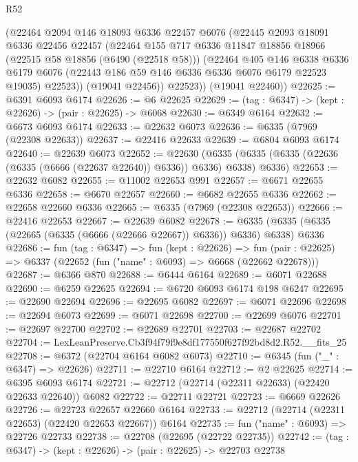 \begin{lexlean}{R52}
\begin{coremodule}
        (@22464
          @2094
          @146
          @18093
          @6336
          @22457
          @6076
          (@22445
            @2093
            @18091
            @6336
            @22456
            @22457
            (@22464
              @155
              @717
              @6336
              @11847
              @18856
              @18966
              (@22515 @58 @18856 (@6490 (@22518 @58)))
              (@22464
                @405
                @146
                @6338
                @6336
                @6179
                @6076
                (@22443 @186 @59 @146 @6336 @6336 @6076 @6179 @22523 @19035)
                @22523))
            (@19041 @22456))
          @22523))
      (@19041 @22460))
@22625 := @6391 @6093 @6174
@22626 := @6 @22625
@22629 := (tag : @6347) -> (kept : @22626) -> (pair : @22625) -> @6068
@22630 := @6349 @6164
@22632 := @6673 @6093 @6174
@22633 := @22632 @6073
@22636 := @6335 (@7969 (@22308 @22633))
@22637 := @22416 @22633
@22639 := @6804 @6093 @6174
@22640 := @22639 @6073
@22652 := @22630
    (@6335 (@6335 (@6335 (@22636 (@6335 (@6666 (@22637 @22640)) @6336)) @6336) @6338) @6336)
@22653 := @22632 @6082
@22655 := @11002 @22653 @991
@22657 := @6671 @22655 @6336
@22658 := @6670 @22657
@22660 := @6682 @22655 @6336
@22662 := @22658 @22660 @6336
@22665 := @6335 (@7969 (@22308 @22653))
@22666 := @22416 @22653
@22667 := @22639 @6082
@22678 := @6335 (@6335 (@6335 (@22665 (@6335 (@6666 (@22666 @22667)) @6336)) @6336) @6338) @6336
@22686 := fun (tag : @6347) =>
  fun (kept : @22626) =>
  fun (pair : @22625) => @6337 (@22652 (fun ("name" : @6093) => @6668 (@22662 @22678)))
@22687 := @6366 @870
@22688 := @6444 @6164
@22689 := @6071 @22688
@22690 := @6259 @22625
@22694 := @6720 @6093 @6174 @198 @6247
@22695 := @22690 @22694
@22696 := @22695 @6082
@22697 := @6071 @22696
@22698 := @22694 @6073
@22699 := @6071 @22698
@22700 := @22699 @6076
@22701 := @22697 @22700
@22702 := @22689 @22701
@22703 := @22687 @22702
@22704 := LexLeanPreserve.Cb3f94f79f9e8df177550f627f92bd8d2.R52.__fits_25
@22708 := @6372 (@22704 @6164 @6082 @6073)
@22710 := @6345 (fun ("_" : @6347) => @22626)
@22711 := @22710 @6164
@22712 := @2 @22625
@22714 := @6395 @6093 @6174
@22721 := @22712 (@22714 (@22311 @22633) (@22420 @22633 @22640)) @6082
@22722 := @22711 @22721
@22723 := @6669 @22626
@22726 := @22723 @22657 @22660 @6164
@22733 := @22712 (@22714 (@22311 @22653) (@22420 @22653 @22667)) @6164
@22735 := fun ("name" : @6093) => @22726 @22733
@22738 := @22708 (@22695 (@22722 @22735))
@22742 := (tag : @6347) -> (kept : @22626) -> (pair : @22625) -> @22703 @22738

\end{coremodule}
\end{lexlean}
